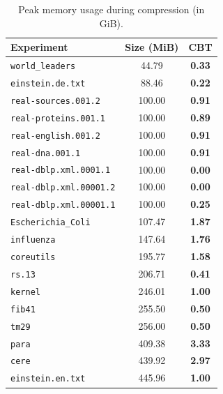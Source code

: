 \begin{table}[t]
\caption{Peak memory usage during compression  (in GiB). }
\label{t:memory-compression}
\centering
\setlength{\tabcolsep}{5pt}
\begin{tabular}{|l|c|c|}
\hline
Experiment & Size (MiB) & CBT \\
\hline
\texttt{world_leaders} & 44.79 & \textbf{0.33} \\
\texttt{einstein.de.txt} & 88.46 & \textbf{0.22} \\
\texttt{real-sources.001.2} & 100.00 & \textbf{0.91} \\
\texttt{real-proteins.001.1} & 100.00 & \textbf{0.89} \\
\texttt{real-english.001.2} & 100.00 & \textbf{0.91} \\
\texttt{real-dna.001.1} & 100.00 & \textbf{0.91} \\
\texttt{real-dblp.xml.0001.1} & 100.00 & \textbf{0.00} \\
\texttt{real-dblp.xml.00001.2} & 100.00 & \textbf{0.00} \\
\texttt{real-dblp.xml.00001.1} & 100.00 & \textbf{0.25} \\
\texttt{Escherichia_Coli} & 107.47 & \textbf{1.87} \\
\texttt{influenza} & 147.64 & \textbf{1.76} \\
\texttt{coreutils} & 195.77 & \textbf{1.58} \\
\texttt{rs.13} & 206.71 & \textbf{0.41} \\
\texttt{kernel} & 246.01 & \textbf{1.00} \\
\texttt{fib41} & 255.50 & \textbf{0.50} \\
\texttt{tm29} & 256.00 & \textbf{0.50} \\
\texttt{para} & 409.38 & \textbf{3.33} \\
\texttt{cere} & 439.92 & \textbf{2.97} \\
\texttt{einstein.en.txt} & 445.96 & \textbf{1.00} \\
\hline
\end{tabular}
\end{table}